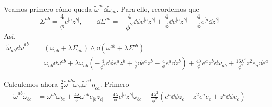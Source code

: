 Veamos primero cómo queda $\tilde{\omega}^{ab}\dd\tilde{\omega}_{ab}$. Para ello, recordemos que
\begin{equation}
  \Sigma^{ab}=\frac{4}{\phi}e^{[a}z^{b]},\qquad \dd\Sigma^{ab}=-\frac{4}{\phi^2}\dd\phi e^{[a}z^{b]}+\frac{4}{\phi}\dd e^{[a}z^{b]}-\frac{4}{\phi}e^{[a}\dd z^{b]}
\end{equation}
Así,
\begin{align*}
  \tilde{\omega}_{ab}\dd \tilde{\omega}^{ab}&=(\omega_{ab}+\lambda\Sigma_{ab})\wedge \dd (\omega^{ab}+\lambda\Sigma^{ab})\\
  &=\omega_{ab}\dd\omega^{ab}+\lambda \omega_{ab}\left(-\frac{4}{\phi^2}\dd\phi e^{a}z^b+\frac{4}{\phi}\dd e^{a}z^b-\frac{4}{\phi}e^{a}\dd z^b\right)+\frac{4\lambda}{\phi}e^{a}z^b\dd\omega_{ab}+\frac{16\lambda^2}{\phi^2}z^2e_a\dd e^{a}
\end{align*}

Calculemos ahora $\frac{2}{3}\tilde{\omega}^{ab}\tilde{\omega}_{bc}\tilde{\omega}^{cd}\eta_{ca}$. Primero
\begin{align}
  \tilde{\omega}^{ab}\tilde{\omega}_{bc}&=\omega^{ab}\omega_{bc}+\frac{4\lambda}{\phi}\omega^{ab}e_{[b}z_{c]}+\frac{4\lambda}{\phi}e^{[a}z^{b]}\omega_{bc}+\frac{4\lambda^2}{\phi^2}(e^{a}\dd\phi z_c-z^2e^{a}e_c+z^{a}\dd\phi e_c)
\end{align}

